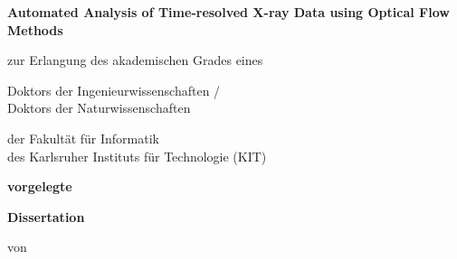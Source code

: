 \begin{titlepage}

\begin{center}
 
  \vspace{100pt}

  
  
    
    {\LARGE \textbf{Automated Analysis of Time-resolved X-ray Data using Optical Flow Methods}}\\[5ex]
  
  
 

  \vspace{35pt}
  
  
  {\large zur Erlangung des akademischen Grades eines}
  
  \vspace{15pt}
  
  {\Large Doktors der Ingenieurwissenschaften /} \\
  {\Large Doktors der Naturwissenschaften }
  
  
  \vspace{40pt}
  
  
  {\large der Fakult\"at f\"ur Informatik} \\
  {\large des Karlsruher Instituts f\"ur Technologie (KIT)}
  
  \vspace{15pt}
  
  {\large \textbf{vorgelegte}}
  
  \vspace{35pt}
  
  
  {\Large \textbf{Dissertation} }
  
  \vspace{15pt}
  
  
  {\large von}
  
  \vspace{15pt}
  


\end{center}
\end{titlepage}
